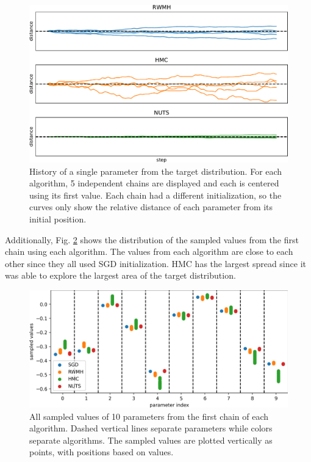 \documentclass[12pt]{article}
\begin{document}
\begin{figure}[H]
\centering
\includegraphics[width=16cm]{plots/uci_param_history.pdf}
\caption{History of a single parameter from the target distribution. For each algorithm, 5 independent chains are displayed and each is centered using its first value. Each chain had a different initialization, so the curves only show the relative distance of each parameter from its initial position.}
\label{fig_uci_param_history}
\end{figure}

Additionally, Fig. \ref{fig_uci_param_distribution} shows the distribution of the sampled values from the first chain using each algorithm. The values from each algorithm are close to each other since they all used SGD initialization. HMC has the largest spread since it was able to explore the largest area of the target distribution.

\begin{figure}[H]
\centering
\includegraphics[width=15cm]{plots/uci_param_distribution.png}
\caption{All sampled values of 10 parameters from the first chain of each algorithm. Dashed vertical lines separate parameters while colors separate algorithms. The sampled values are plotted vertically as points, with positions based on values.}
\label{fig_uci_param_distribution}
\end{figure}
\end{document}
